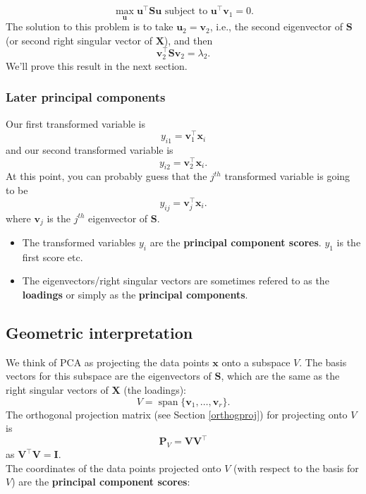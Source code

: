 \documentclass[]{book}
\providecommand{\tightlist}{%
  \setlength{\itemsep}{0pt}\setlength{\parskip}{0pt}}
\theoremstyle{definition}
\theoremstyle{definition}
\theoremstyle{definition}
\theoremstyle{remark}
\begin{document}
\[\max_{\mathbf u} \mathbf u^\top \mathbf S\mathbf u\mbox{ subject to } \mathbf u^\top \mathbf v_1=0.\]
The solution to this problem is to take \(\mathbf u_2 = \mathbf v_2\), i.e., the second eigenvector of \(\mathbf S\) (or second right singular vector of \(\mathbf X\)), and then \[\mathbf v_2^\top \mathbf S\mathbf v_2=\lambda_2.\]
We'll prove this result in the next section.

\hypertarget{later-principal-components}{%
\subsubsection*{Later principal components}\label{later-principal-components}}

Our first transformed variable is
\[y_{i1}= \mathbf v_1^\top \mathbf x_i\]
and our second transformed variable is
\[y_{i2}= \mathbf v_2^\top \mathbf x_i.\]
At this point, you can probably guess that the \(j^{th}\) transformed variable is going to be
\[y_{ij}= \mathbf v_j^\top \mathbf x_i.\]
where \(\mathbf v_j\) is the \(j^{th}\) eigenvector of \(\mathbf S\).

\begin{itemize}
\tightlist
\item
  The transformed variables \(y_{i}\) are the \textbf{principal component scores}. \(y_1\) is the first score etc.
\item
  The eigenvectors/right singular vectors are sometimes refered to as the \textbf{loadings} or simply as the \textbf{principal components}.
\end{itemize}

\hypertarget{geometric-interpretation-1}{%
\subsection{Geometric interpretation}\label{geometric-interpretation-1}}

We think of PCA as projecting the data points \(\mathbf x\) onto a subspace \(V\). The basis vectors for this subspace are the eigenvectors of \(\mathbf S\), which are the same as the right singular vectors of \(\mathbf X\) (the loadings):
\[V=\operatorname{span}\{\mathbf v_1, \ldots, \mathbf v_r\}.\]
The orthogonal projection matrix (see Section \ref{orthogproj}) for projecting onto \(V\) is
\[\mathbf P_V = \mathbf V\mathbf V^\top\]
as \(\mathbf V^\top \mathbf V=\mathbf I\).\\
The coordinates of the data points projected onto \(V\) (with respect to the basis for \(V\)) are the \textbf{principal component scores}:
\end{document}
